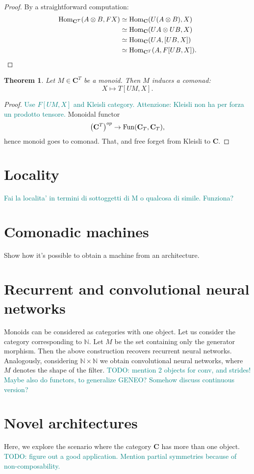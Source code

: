 \documentclass[12pt]{article}
\newtheorem{theorem}{Theorem}
\newcommand{\pietro}[1]{\textcolor{teal}{#1}}
\newcommand{\Hom}{{\textnormal{Hom}}}
\newcommand{\Fun}{{\textnormal{Fun}}}
\newcommand{\Cat}{{\mathbf{C}}}
\begin{document}
\begin{proof}
    By a straightforward computation:
    \begin{align*}
        \Hom_{\Cat^T}(A\otimes B, FX)
        &\simeq \Hom_{\Cat}(U(A \otimes B), X)\\
        &\simeq \Hom_{\Cat}(UA \otimes UB, X)\\
        &\simeq \Hom_{\Cat}(UA, [UB, X])\\
        &\simeq \Hom_{\Cat^T}(A, F[UB, X]).
    \end{align*}
\end{proof}

\begin{theorem}\label{thm:weight_sharing}
    Let $M \in \Cat^T$ be a monoid. Then $M$ induces a comonad:
    \begin{equation*}
        X \mapsto T[UM, X].
    \end{equation*}
\end{theorem}

\begin{proof}
    \pietro{Use $F[UM, X]$ and Kleisli category. Attenzione: Kleisli non ha per forza un prodotto tensore.} Monoidal functor
    \begin{equation*}
        \left(\Cat^T\right)^{op} \rightarrow \Fun(\Cat_T, \Cat_T),
    \end{equation*}
    hence monoid goes to comonad. That, and free forget from Kleisli to $\Cat$.
\end{proof}

\section{Locality}

\pietro{Fai la localita' in termini di sottoggetti di M o qualcosa di simile. Funziona?}

\section{Comonadic machines}

Show how it's possible to obtain a machine from an architecture.

\section{Recurrent and convolutional neural networks}

Monoids can be considered as categories with one object. Let us consider the category corresponding to $\mathbb N$. Let $M$ be the set containing only the generator morphism. Then the above construction recovers recurrent neural networks. Analogously, considering $\mathbb N \times \mathbb N$ we obtain convolutional neural networks, where $M$ denotes the shape of the filter.
\pietro{TODO: mention 2 objects for conv, and strides!}
\pietro{Maybe also do functors, to generalize GENEO? Somehow discuss continuous version?}

\section{Novel architectures}

Here, we explore the scenario where the category $\Cat$ has more than one object.
\pietro{TODO: figure out a good application.}
\pietro{Mention partial symmetries because of non-composability.}



\end{document}
